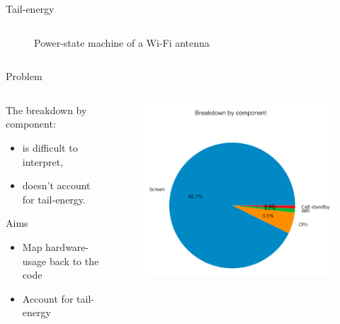 \begin{frame}{Tail-energy}
\begin{columns}
\begin{column}{0.5\textwidth}
\begin{figure}
	\caption{Power-state machine of a Wi-Fi antenna}
\end{figure}
\end{column}
\end{columns}
\end{frame}
%
%
\begin{frame}{Problem}
\begin{columns}
\begin{column}{0.5\textwidth}
The breakdown by component:
\begin{itemize}
\item is \alert{difficult to interpret},
\item doesn't account for \alert{tail-energy}.
\end{itemize}
\begin{block}{Aims}
\begin{itemize}
\item Map hardware-usage back to the code
\item Account for tail-energy
\end{itemize}
\end{block}
\end{column}
\begin{column}{0.5\textwidth}
\begin{figure}
	\includegraphics[width=\textwidth]{figures/hw_breakdown.png} 
\end{figure}
\end{column}
\end{columns}
\end{frame}
